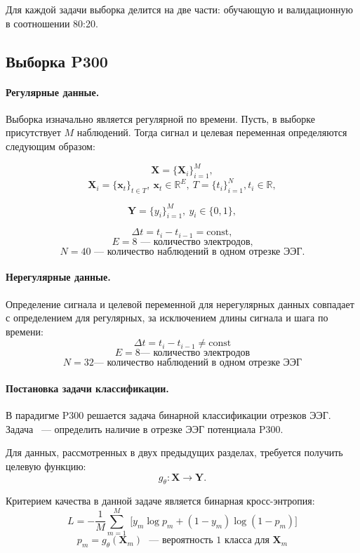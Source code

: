 \documentclass[a4paper, 12pt]{article} %
\newcommand{\x}{\mathbf{x}}
\newcommand{\Y}{\mathbf{Y}}
\newcommand{\X}{\mathbf{X}}
\newcommand{\R}{\mathbb{R}}
\begin{document}
    Для каждой задачи выборка делится на две части: обучающую и валидационную в соотношении 80:20.
    
\subsection{Выборка P300}
\paragraph{Регулярные данные.}
    
Выборка изначально является регулярной по времени. Пусть, в выборке присутствует $M$ наблюдений. Тогда сигнал и целевая переменная определяются следующим образом:
    
    $$\X = \{\X_i\}_{i=1}^{M},$$
    $$\X_i = \{\x_t\}_{t\in T}, \ \x_t \in \R^E, \ T = \{t_i\}_{i=1}^{N}, t_i \in \R,$$ 
    
    $$\Y = \{y_i\}_{i=1}^{M},\ y_i \in \{0, 1\},$$
    
    $$\Delta t = t_i - t_{i-1} = \text{const},$$
    $$E=8 \text{~--- количество электродов,}$$
    $$N=40 \text{~--- количество наблюдений в одном отрезке ЭЭГ.}$$
    
    \paragraph{Нерегулярные данные.}
    
    Определение сигнала и целевой переменной для нерегулярных данных совпадает с определением для регулярных, за исключением длины сигнала и шага по времени:
    $$\Delta t = t_i - t_{i-1} \neq \text{const}$$
    $$E=8 \text{--- количество электродов}$$
    $$N=32 \text{--- количество наблюдений в одном отрезке ЭЭГ}$$

    \paragraph{Постановка задачи классификации.}
    
    В парадигме P300 решается задача бинарной классификации отрезков ЭЭГ. Задача ~--- определить наличие в отрезке ЭЭГ потенциала P300.
    
    Для данных, рассмотренных в двух предыдущих разделах, требуется получить целевую функцию:
    $$g_{\theta}: \X \to \Y.$$
    
    Критерием качества в данной задаче является бинарная кросс-энтропия: 
    $$L =  -{\frac {1}{M}}\sum _{m=1}^{M}\ {\bigg [}y_{m}\log {p}_{m}+(1-y_{m})\log(1-{p}_{m}){\bigg ]}$$
    $$p_m = g_{\theta}(\X_m) \text{ ~--- вероятность 1 класса для } \X_m$$
\end{document}
